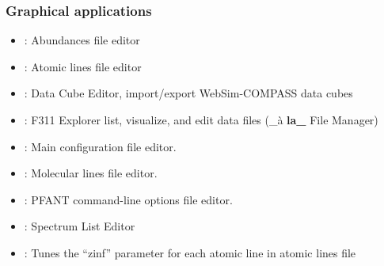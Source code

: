 \documentclass[letterpaper,10pt,english]{sphinxmanual}
\begin{document}
\subsubsection{Graphical applications}
\label{\detokenize{intro:id3}}\begin{itemize}
\item {} 
{\hyperref[\detokenize{autoscripts/script-abed::doc}]{}}: Abundances file editor

\item {} 
{\hyperref[\detokenize{autoscripts/script-ated::doc}]{}}: Atomic lines file editor

\item {} 
{\hyperref[\detokenize{autoscripts/script-cubeed::doc}]{}}: Data Cube Editor, import/export WebSim-COMPASS data cubes

\item {} 
{\hyperref[\detokenize{autoscripts/script-explorer::doc}]{}}: F311 Explorer \textendash{}  list, visualize, and edit data files (\_à {\color{red}\bfseries{}la\_} File Manager)

\item {} 
{\hyperref[\detokenize{autoscripts/script-mained::doc}]{}}: Main configuration file editor.

\item {} 
{\hyperref[\detokenize{autoscripts/script-mled::doc}]{}}: Molecular lines file editor.

\item {} 
{\hyperref[\detokenize{autoscripts/script-optionsed::doc}]{}}: PFANT command-line options file editor.

\item {} 
{\hyperref[\detokenize{autoscripts/script-splisted::doc}]{}}: Spectrum List Editor

\item {} 
{\hyperref[\detokenize{autoscripts/script-tune-zinf::doc}]{}}: Tunes the “zinf” parameter for each atomic line in atomic lines file

\end{itemize}
\end{document}

